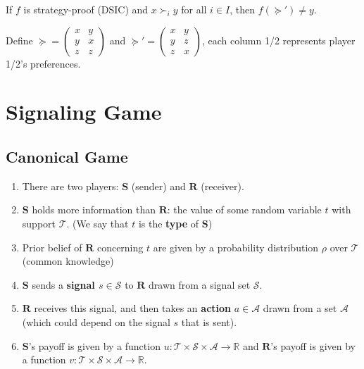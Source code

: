 \documentclass[11pt]{elegantbook}
\begin{document}
\begin{lemma}
    If $f$ is strategy-proof (DSIC) and $x\succ_i y$ for all $i\in I$, then $f(\succeq')\neq y$.
\end{lemma}

\begin{example}
    Define $\succeq=\begin{pmatrix}
        x&y\\
        y&x\\
        z&z
    \end{pmatrix}$ and $\succeq'=\begin{pmatrix}
        x&y\\
        y&z\\
        z&x
    \end{pmatrix}$, each column 1/2 represents player 1/2's preferences.
\end{example}






\section{Signaling Game}
\subsection{Canonical Game}
\begin{definition}
    \normalfont
    \begin{enumerate}
        \item There are two players: $\mathbf{S}$ (sender) and $\mathbf{R}$ (receiver).
        \item $\mathbf{S}$ holds more information than $\mathbf{R}$: the value of some random variable $t$ with support $\mathcal{T}$. (We say that $t$ is the \textbf{type} of $\mathbf{S}$)
        \item Prior belief of $\mathbf{R}$ concerning $t$ are given by a probability distribution $\rho$ over $\mathcal{T}$ (common knowledge)
        \item $\mathbf{S}$ sends a \textbf{signal $s\in \mathcal{S}$} to $\mathbf{R}$ drawn from a signal set $\mathcal{S}$.
        \item $\mathbf{R}$ receives this signal, and then takes an \textbf{action} $a\in \mathcal{A}$ drawn from a set $\mathcal{A}$ (which could depend on the signal $s$ that is sent).
        \item $\mathbf{S}$'s payoff is given by a function $u: \mathcal{T}\times \mathcal{S} \times \mathcal{A} \rightarrow \mathbb{R}$ and $\mathbf{R}$'s payoff is given by a function $v: \mathcal{T}\times \mathcal{S} \times \mathcal{A} \rightarrow \mathbb{R}$.
    \end{enumerate}
\end{definition}
\end{document}
